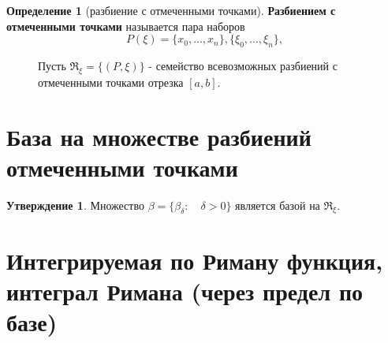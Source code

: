 \documentclass{report}
\theoremstyle{definition}
\newtheorem*{definition}{Определение}
\newtheorem*{statement}{Утверждение}
\begin{document}
\begin{definition}[разбиение с отмеченными точками]
    \textbf{Разбиением с отмеченными точками} называется пара наборов
    \begin{equation*}
        P(\xi) = \{x_{0},\ldots,x_{n}\},\{\xi_{0},\ldots,\xi_{n}\},
    \end{equation*}
    \begin{figure}[h]
        \begin{minipage}[h]{0.49\linewidth}
        \end{minipage}
        \hfill
        \begin{minipage}[h]{0.49\linewidth}
            Пусть $\Re_{\xi} = \{(P,\xi)\}$ - семейство всевозможных разбиений с отмеченными точками отрезка $[a,b]$.
        \end{minipage}
    \end{figure}
\end{definition}

\section{База на множестве разбиений отмеченными точками}

\begin{statement}
    Множество $\beta = \{\beta_{\delta}:\quad \delta > 0\}$ является базой на $\Re_{\xi}$.
\end{statement}

\section{Интегрируемая по Риману функция, интеграл Римана (через предел по базе)}
\end{document}
